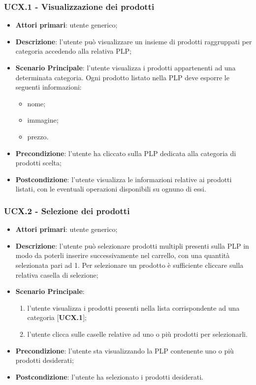\subsubsection{UCX.1 - Visualizzazione dei prodotti}
\begin{itemize}
\item \textbf{Attori primari}: utente generico;
\item \textbf{Descrizione}: l'utente può visualizzare un insieme di prodotti raggruppati per categoria accedendo alla relativa PLP;
\item \textbf{Scenario Principale}: l'utente visualizza i prodotti appartenenti ad una determinata categoria. Ogni prodotto listato nella PLP deve esporre le seguenti informazioni:
\begin{itemize}
\item nome;
\item immagine;
\item prezzo.
\end{itemize}
\item \textbf{Precondizione}: l'utente ha cliccato sulla PLP dedicata alla categoria di prodotti scelta;
\item \textbf{Postcondizione}: l'utente visualizza le informazioni relative ai prodotti listati, con le eventuali operazioni disponibili su ognuno di essi.
\end{itemize}
\subsubsection{UCX.2 - Selezione dei prodotti}
\begin{itemize}
\item \textbf{Attori primari}: utente generico;
\item \textbf{Descrizione}: l'utente può selezionare prodotti multipli presenti sulla PLP in modo da poterli inserire successivamente nel carrello, con una quantità selezionata pari ad 1. Per selezionare un prodotto è sufficiente cliccare sulla relativa casella di selezione;
\item \textbf{Scenario Principale}:
\begin{enumerate}
\item l'utente visualizza i prodotti presenti nella lista corrispondente ad una categoria [\textbf{UCX.1}];
\item l'utente clicca sulle caselle relative ad uno o più prodotti per selezionarli.
\end{enumerate}
\item \textbf{Precondizione}: l'utente sta visualizzando la PLP contenente uno o più prodotti desiderati;
\item \textbf{Postcondizione}: l'utente ha selezionato i prodotti desiderati.
\end{itemize}
